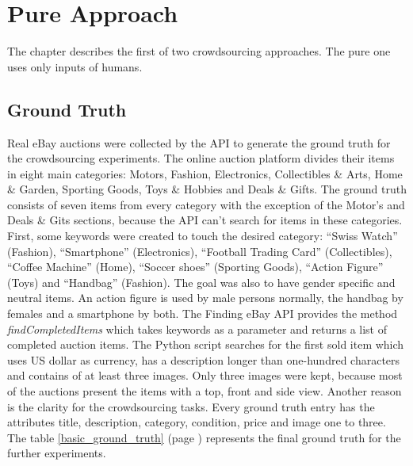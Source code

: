 \section{Pure Approach}
The chapter describes the first of two crowdsourcing approaches. The pure one uses only inputs of humans.
\subsection{Ground Truth}
\label{ground_truth}
Real eBay auctions were collected by the API to generate the ground truth for the crowdsourcing experiments. The online auction platform divides their items in eight main categories: Motors, Fashion, Electronics, Collectibles \& Arts, Home \& Garden, Sporting Goods, Toys \& Hobbies and Deals \& Gifts. The ground truth consists of seven items from every category with the exception of the Motor's and Deals \& Gits sections, because the API can't search for items in these categories. First, some keywords were created to touch the desired category: ``Swiss Watch'' (Fashion), ``Smartphone'' (Electronics), ``Football Trading Card'' (Collectibles), ``Coffee Machine'' (Home), ``Soccer shoes'' (Sporting Goods), ``Action Figure'' (Toys) and ``Handbag'' (Fashion). The goal was also to have gender specific and neutral items. An action figure is used by male persons normally, the handbag by females and a smartphone by both. The Finding eBay API provides the method \textit{findCompletedItems} which takes keywords as a parameter and returns a list of completed auction items. The Python script searches for the first sold item which uses US dollar as currency, has a description longer than one-hundred characters and contains of at least three images. Only three images were kept, because most of the auctions present the items with a top, front and side view. Another reason is the clarity for the crowdsourcing tasks. Every ground truth entry has the attributes title, description, category, condition, price and image one to three. The table \ref{basic_ground_truth} (page \pageref{basic_ground_truth}) represents the final ground truth for the further experiments.


